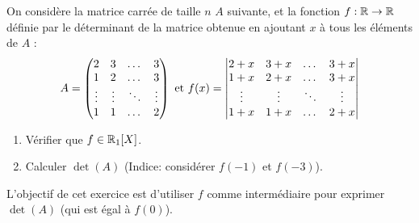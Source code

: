 \documentclass[12pt, a4paper]{report}
\begin{document}
\begin{exercise}
    On considère la matrice carrée de taille $n$ $A$ suivante, et la fonction $f : \mathbb{R} \to \mathbb{R}$ définie par le déterminant de la matrice obtenue en ajoutant $x$ à tous les éléments de $A$ :
    $$
        A = \left(\begin{matrix} 2 & 3 & \dots & 3 \\ 1 & 2 & \dots & 3 \\ \vdots & \vdots & \ddots & \vdots \\ 1 & 1 & \dots & 2 \end{matrix}\right) \text{ et }
        f(x) = \left|\begin{matrix} 2+x & 3+x & \dots & 3+x \\ 1+x & 2+x & \dots & 3+x \\ \vdots & \vdots & \ddots & \vdots \\ 1+x & 1+x & \dots & 2+x \end{matrix}\right|$$
    \begin{enumerate}
        \item Vérifier que $f \in \mathbb{R}_1[X]$.
        \item Calculer $\det(A)$ (Indice: considérer $f(-1)$ et $f(-3)$).
    \end{enumerate}
\end{exercise}

L'objectif de cet exercice est d'utiliser $f$ comme intermédiaire pour exprimer $\det(A)$ (qui est égal à $f(0)$).
\end{document}
